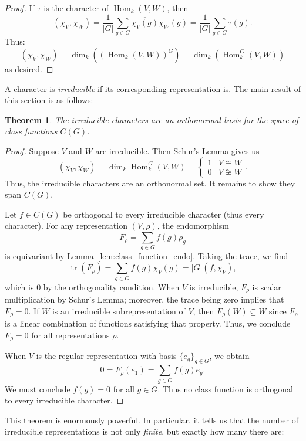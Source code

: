 \documentclass[12pt]{article}
\theoremstyle{plain}
\newtheorem{theorem}{Theorem}[section]
\theoremstyle{definition}
\theoremstyle{remark}
\numberwithin{equation}{section}
\begin{document}
\begin{proof}
If $\tau$ is the character of $\operatorname{Hom}_k(V,W)$, then
\[ ( \chi_V , \chi_W ) = \frac{1}{|G|}
\sum_{g \in G} \overline{\chi_V(g)} \chi_W(g)
= \frac{1}{|G|} \sum_{g \in G} \tau(g) .
\]
Thus:
\[ ( \chi_V , \chi_W ) =
\dim_k\left(\left( \operatorname{Hom}_k\left(V,W\right) \right)^G\right) =
\dim_k( \operatorname{Hom}^G_k(V,W) ) \]
as desired.
\end{proof}

A character is \emph{irreducible} if its corresponding representation
is.
The main result of this section is as follows:

\begin{theorem}
The irreducible characters are an orthonormal basis for the space of
class functions $C(G)$.
\end{theorem}

\begin{proof}
Suppose $V$ and $W$ are irreducible.
Then Schur's Lemma gives us
\[
\left( \chi_V, \chi_W \right)
= \dim_k \operatorname{Hom}^G_k(V,W) =
\begin{cases}
1 & V \cong W\\
0 & V \not\cong W
\end{cases}.
\]
Thus, the irreducible characters are an orthonormal set.
It remains to show they span $C(G)$.

Let $f \in C(G)$ be orthogonal to every irreducible character
(thus every character).
For any representation $(V,\rho)$, the endomorphism
\[
F_\rho = \sum_{g \in G} \overline{f(g)} \rho_g
\]
is equivariant by Lemma~\ref{lem:class_function_endo}.
Taking the trace, we find
\[
\operatorname{tr}(F_\rho) =
\sum_{g \in G} \overline{f(g)} \chi_V(g)
= |G| (f,\chi_V),
\]
which is $0$ by the orthogonality condition.
When $V$ is irreducible,
$F_\rho$ is scalar multiplication by Schur's Lemma;
moreover, the trace being zero implies that
$F_\rho=0$.
If $W$ is an irreducible subrepresentation of $V$,
then $F_\rho(W) \subseteq W$ since $F_\rho$ is a linear combination of
functions satisfying that property.
Thus, we conclude $F_\rho=0$ for all representations $\rho$.

When $V$ is the regular representation with basis $\{e_g\}_{g \in G}$,
we obtain
\[
0=F_\rho(e_1)=\sum_{g \in G} \overline{f(g)} e_g .
\]
We must conclude $f(g)=0$ for all $g \in G$.  Thus no class function is
orthogonal to every irreducible character.
\end{proof}

This theorem is enormously powerful.  In particular, it tells us that
the number of irreducible representations is not only \emph{finite}, but
exactly how many there are:
\end{document}

